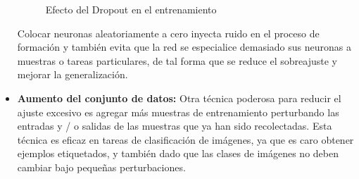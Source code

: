 \begin{itemize}
\begin{figure}[H]
        \caption{Efecto del Dropout en el entrenamiento}
        \label{dropout}
    \end{figure}
    Colocar neuronas aleatoriamente a cero inyecta ruido en el proceso de formación y también evita que la red se especialice demasiado  sus neuronas a muestras o tareas particulares, de tal forma que se reduce el sobreajuste y mejorar la generalización.
    \item \textbf{Aumento del conjunto de datos:} Otra técnica poderosa para reducir el ajuste excesivo es agregar más muestras de entrenamiento perturbando las entradas y / o salidas de las muestras que ya han sido recolectadas. Esta técnica es eficaz en tareas de clasificación de imágenes, ya que es caro obtener ejemplos etiquetados, y también dado que las clases de imágenes no deben cambiar bajo pequeñas perturbaciones.
\end{itemize}
